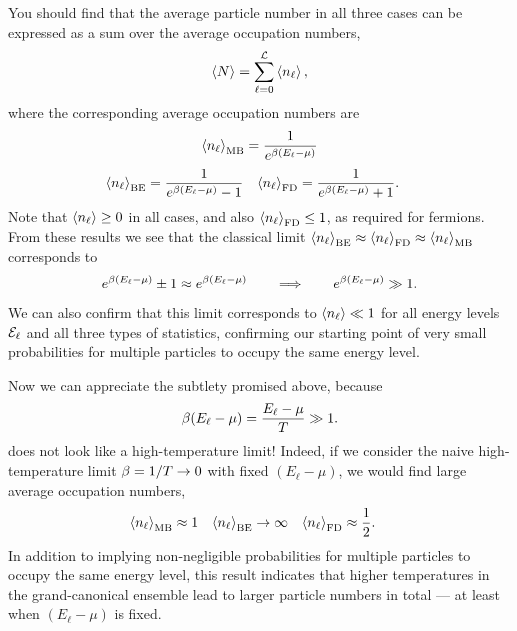 You should find that the average particle number in all three cases can be expressed as a sum over the average occupation numbers,
\begin{equation*}
  \left\langle N \right\rangle = \sum_{\ell = 0}^{\mathcal L} \left\langle n_{\ell} \right\rangle,
\end{equation*}
where the corresponding average occupation numbers are
\begin{equation*}
  \left\langle n_{\ell} \right\rangle_{\text{MB}} = \frac{1}{e^{\beta (E_{\ell} - \mu)}}
\end{equation*}
\begin{align*}
  \left\langle n_{\ell} \right\rangle_{\text{BE}} & = \frac{1}{e^{\beta (E_{\ell} - \mu)} - 1} &
  \left\langle n_{\ell} \right\rangle_{\text{FD}} & = \frac{1}{e^{\beta (E_{\ell} - \mu)} + 1}.
\end{align*}
Note that $\left\langle n_{\ell} \right\rangle \geq 0$ in all cases, and also $\left\langle n_{\ell} \right\rangle_{\text{FD}} \leq 1$, as required for fermions.
From these results we see that the classical limit $\left\langle n_{\ell} \right\rangle_{\text{BE}} \approx \left\langle n_{\ell} \right\rangle_{\text{FD}} \approx \left\langle n_{\ell} \right\rangle_{\text{MB}}$ corresponds to
\begin{equation*}
  e^{\beta (E_{\ell} - \mu)} \pm 1 \approx e^{\beta (E_{\ell} - \mu)} \qquad \Longrightarrow \qquad e^{\beta (E_{\ell} - \mu)} \gg 1.
\end{equation*}
We can also confirm that this limit corresponds to $\left\langle n_{\ell} \right\rangle \ll 1$ for all energy levels $\mathcal E_{\ell}$ and all three types of statistics, confirming our starting point of very small probabilities for multiple particles to occupy the same energy level.

Now we can appreciate the subtlety promised above, because
\begin{equation}
  \label{eq:highT_ratio}
  \beta (E_{\ell} - \mu) = \frac{E_{\ell} - \mu}{T} \gg 1.
\end{equation}
does not look like a high-temperature limit!
Indeed, if we consider the naive high-temperature limit $\beta = 1 / T \to 0$ with fixed $(E_{\ell} - \mu)$, we would find large average occupation numbers,
\begin{align*}
  \left\langle n_{\ell} \right\rangle_{\text{MB}} & \approx 1 &
  \left\langle n_{\ell} \right\rangle_{\text{BE}} & \to \infty & 
  \left\langle n_{\ell} \right\rangle_{\text{FD}} & \approx \frac{1}{2}.
\end{align*}
In addition to implying non-negligible probabilities for multiple particles to occupy the same energy level, this result indicates that higher temperatures in the grand-canonical ensemble lead to larger particle numbers in total --- at least when $(E_{\ell} - \mu)$ is fixed. %

